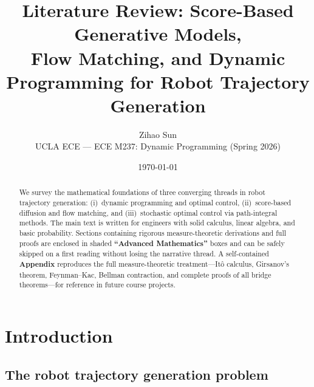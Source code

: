 \documentclass[11pt,letterpaper]{article}
\title{\bfseries
Literature Review: Score-Based Generative Models, \\
Flow Matching, and Dynamic Programming for Robot Trajectory Generation}
\author{Zihao Sun\\[2pt]
  \small UCLA ECE --- ECE M237: Dynamic Programming (Spring 2026)}
\date{\today}
\theoremstyle{plain}
\theoremstyle{definition}
\theoremstyle{remark}
\begin{document}
\maketitle

\begin{abstract}
We survey the mathematical foundations of three converging threads in
robot trajectory generation: (i)~dynamic programming and optimal control,
(ii)~score-based diffusion and flow matching, and (iii)~stochastic
optimal control via path-integral methods.  The main text is written for
engineers with solid calculus, linear algebra, and basic probability.
Sections containing rigorous measure-theoretic derivations and full
proofs are enclosed in shaded
\textbf{``Advanced Mathematics''} boxes and can be safely
skipped on a first reading without losing the narrative thread.
A self-contained \textbf{Appendix} reproduces the full
measure-theoretic treatment---It\^o calculus, Girsanov's theorem,
Feynman--Kac, Bellman contraction, and complete proofs of all bridge
theorems---for reference in future course projects.
\end{abstract}

\tableofcontents
\bigskip

\section{Introduction}\label{sec:intro}

\subsection{The robot trajectory generation problem}
\end{document}
